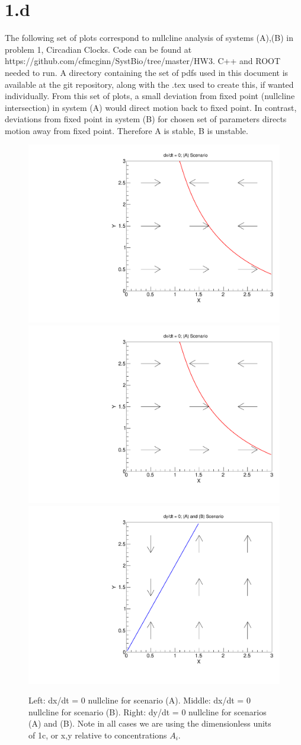 \documentclass{article}
\begin{document}
\section{1.d}

The following set of plots correspond to nullcline analysis of systems (A),(B) in problem 1, Circadian Clocks. Code can be found at https://github.com/cfmcginn/SystBio/tree/master/HW3. C++ and ROOT needed to run. A directory containing the set of pdfs used in this document is available at the git repository, along with the .tex used to create this, if wanted individually. From this set of plots, a small deviation from fixed point (nullcline intersection) in system (A) would direct motion back to fixed point. In contrast, deviations from fixed point in system (B) for chosen set of parameters directs motion away from fixed point. Therefore A is stable, B is unstable.

\begin{figure}[H]
    \centering
    \includegraphics[width=.32\textwidth]{xDotNull1Canv.pdf} 
    \includegraphics[width=.32\textwidth]{xDotNull1Canv.pdf}
    \includegraphics[width=.32\textwidth]{yDotNullCanv.pdf}
    \caption{Left: dx/dt = 0 nullcline for scenario (A). Middle: dx/dt = 0 nullcline for scenario (B). Right: dy/dt = 0 nullcline for scenarios (A) and (B). Note in all cases we are using the dimensionless units of 1c, or x,y relative to concentrations $A_{i}$.}
    \label{}
\end{figure}
\end{document}
